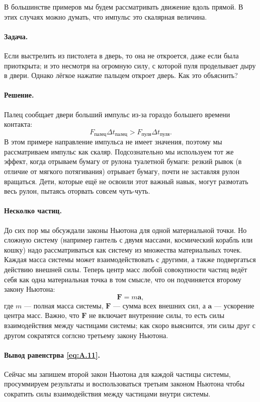 В большинстве примеров мы будем рассматривать движение вдоль прямой.
В этих случаях можно думать, что импульс это скалярная величина.

\paragraph{Задача.}
Если выстрелить из пистолета в дверь, то она не откроется, даже если была приоткрыта;
и это несмотря на огромную силу, с которой пуля проделывает дыру в двери.
Однако лёгкое нажатие пальцем откроет дверь.
Как это объяснить?

\paragraph{Решение.}
Палец сообщает двери больший импульс
из-за гораздо большего времени контакта:
\[
F_{\text{палец}}  \Delta t_{\text{палец}}
>
F_{\text{пуля}}  \Delta t_{\text{пуля}}.
\]
В этом примере направление импульса не имеет значения, поэтому мы рассматриваем импульс как скаляр.
Подсознательно мы используем тот же эффект, когда отрываем бумагу от рулона туалетной бумаги: резкий рывок (в отличие от мягкого потягивания) отрывает бумагу, почти не заставляя
рулон вращаться.
Дети, которые ещё не освоили этот важный навык, могут размотать весь рулон, пытаясь оторвать совсем чуть-чуть.

\paragraph{Несколко частиц.}
До сих пор мы обсуждали законы Ньютона для одной материальной точки.
Но сложную систему (например гантель с двумя массами, космический корабль или кошку) надо рассматриваться как систему из множества материальных точек.
Каждая масса системы может взаимодействовать с другими, а также подвергаться
действию внешней силы.
Теперь центр масс любой совокупности частиц ведёт себя как одна
материальная точка в том смысле, что он подчиняется второму закону Ньютона:
\begin{equation}
    \mathbf{F} = m \mathbf{a},
    \label{eq:A.11}
\end{equation}
где $m$ — полная масса системы, $\mathbf{F}$ — сумма всех внешних сил,
а $\mathbf{a}$ — ускорение центра масс.
Важно, что $\mathbf{F}$ не включает внутренние силы, то есть силы взаимодействия между частицами системы;
как скоро выяснится, эти силы друг с другом сократятся соглсно третьему закону Ньютона.

\paragraph{Вывод равенстрва \eqref{eq:A.11}.}
Сейчас мы запишем второй закон Ньютона для каждой частицы системы, просуммируем результаты и воспользоваться
третьим законом Ньютона чтобы сократить силы взаимодействия между частицами внутри системы.


